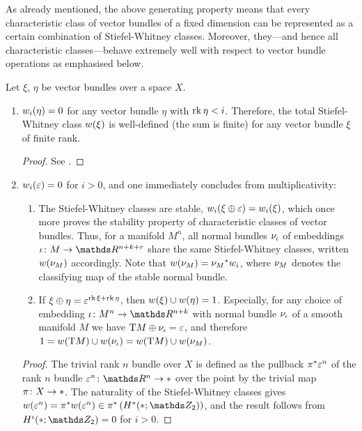 As already mentioned, the above generating property means that every
characteristic class of vector bundles of a fixed dimension can be
represented as a certain combination of Stiefel-Whitney classes.
Moreover, they---and hence all characteristic classes---behave
extremely well with respect to vector bundle operations as emphasised
below.
\begin{Rem}
  \label{rem:propswclasses}
  Let $\xi$, $\eta$ be vector bundles over a space $X$.
  \begin{enumerate} 
  \item\label{item:propswclasses:dimesioncut} ${w_{i}}(\eta) = 0$
    for any vector bundle $\eta$ with $\operatorname{rk}\eta < i$.
    Therefore, the total Stiefel-Whitney class ${w}(\xi)$ is
    well-defined (\idest the sum is finite)
    for any vector bundle $\xi$ of finite rank.
    \begin{proof}
      See \cite[Sec.~19.4]{tomdieck}.
    \end{proof}
  \item\label{item:swoftrivbdl}
    ${w_{i}}(\varepsilon)=0$ for $i>0$, and one immediately concludes
    from multiplicativity:
    \begin{enumerate}
    \item\label{item:swclassesstable}
      The Stiefel-Whitney classes are stable, \idest
      ${w_{i}}(\xi\oplus\varepsilon) = {w_{i}}(\xi)$, which once more proves
      the stability property of characteristic classes of vector bundles.
      Thus, for a manifold $M^n$, all normal bundles $\nu_{{\iota}}$ of
      embeddings $\emb\colon M\to\R^{n+k+r}$ share the same
      Stiefel-Whitney classes, written ${w}(\nu_{M})$ accordingly.
      Note that ${w}(\nu_{M}) = {\nu_{M}}^*w_{i}$, where $\nu_{M}$ denotes the
      classifying map of the stable normal bundle.
    \item\label{item:wuclassmfdinverse}
      If $\xi\oplus\eta = \varepsilon^{\operatorname{rk}\xi+\operatorname{rk}\eta}$, then
      ${w}(\xi)\cup{w}(\eta)=1$.
      Especially, for any choice of embedding $\emb\colon M^n\to\R^{n+k}$
      with normal bundle $\nu_{{\iota}}$ of a smooth manifold $M$ we have
      $\mathrm{T}M\oplus\nu_{{\iota}} = \varepsilon$, and therefore
      $1 = {w}(\mathrm{T}M) \cup {w}(\nu_{{\iota}}) = {w}(\mathrm{T}M)\cup{w}(\nu_{M})$.
    \end{enumerate}
    \begin{proof}
      The trivial rank $n$ bundle over $X$ is defined as the pullback
      ${\pi}^* \varepsilon^n$ of the rank $n$ bundle
      $\trivbdl^n\colon \R^n\to\pt$ over the point by the trivial map
      $\pi\colon X\to*$. The naturality of the Stiefel-Whitney
      classes gives $\W{\trivbdl^n} = \pb\pi \W{\trivbdl^n}
      \in\pb\pi \left(\H^*(\pt;\Zmod2)\right)$,
      and the result follows from $\H^i(\pt;\Zmod2) = 0$ for $i>0$.
    \end{proof}
  \end{enumerate}
\end{Rem}

